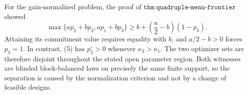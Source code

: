 For the gain-normalized problem, the proof of \(\texttt{thm:quadruple-menu-frontier}\) showed
\[
\max\{ap_2+bp_3,ap_1+bp_3\}
\ge b+\left(\frac a2-b\right)(1-p_3). \tag{10}
\]
Attaining its commitment value requires equality with \(b\), and \(a/2-b>0\) forces \(p_3=1\).  In contrast, (5) has \(p_2^\circ>0\) whenever \(\kappa_2>\kappa_1\).  The two optimizer sets are therefore disjoint throughout the stated open parameter region.  Both witnesses are blinded block-balanced laws on precisely the same finite support, so the separation is caused by the normalization criterion and not by a change of feasible designs.